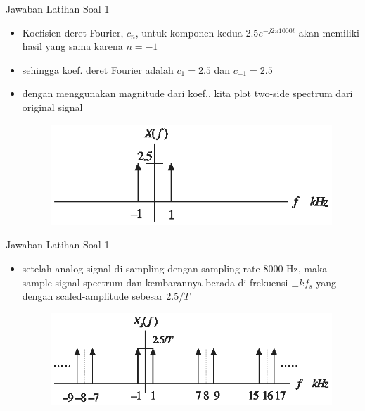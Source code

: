 \documentclass[pdflatex,compress,mathserif]{beamer}
\begin{document}
\begin{frame}{Jawaban Latihan Soal 1}
    \begin{itemize}
        \item Koefisien deret Fourier, $c_n$, untuk komponen kedua $2.5 e^{-j2 \pi 1000t}$ akan memiliki hasil yang sama karena $n = -1$
        \item sehingga koef. deret Fourier adalah $c_1 = 2.5$ dan $c_{-1} = 2.5$
        \item dengan menggunakan magnitude dari koef., kita plot two-side spectrum dari original signal
        \begin{figure}
            \includegraphics[width=\linewidth]{./img/img12}
        \end{figure}
    \end{itemize}
\end{frame}

\begin{frame}{Jawaban Latihan Soal 1}
    \begin{itemize}
        \item setelah analog signal di sampling dengan sampling rate 8000 Hz, maka sample signal spectrum dan kembarannya berada di frekuensi $\pm kf_s$ yang dengan scaled-amplitude sebesar $2.5/T$
        \begin{figure}
            \includegraphics[width=\linewidth]{./img/img13}
        \end{figure}
    \end{itemize}
\end{frame}
\end{document}
